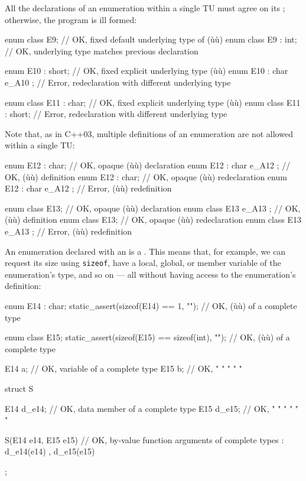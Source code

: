All the declarations of an enumeration within a single TU must agree on its ; otherwise, the program is ill formed:

\begin{emcppslisting}
enum class E9;              // OK, fixed default underlying type of (ù{}ù)
enum class E9 : int;        // OK, underlying type matches previous declaration

enum E10 : short;           // OK, fixed explicit underlying type (ù{}ù)
enum E10 : char { e_A10 };  // Error, redeclaration with different underlying type

enum class E11 : char;      // OK, fixed explicit underlying type (ù{}ù)
enum class E11 : short;     // Error, redeclaration with different underlying type
\end{emcppslisting}

Note that, as in C++03, multiple definitions of an enumeration are not allowed within a single TU:

\begin{emcppslisting}
enum E12 : char;            // OK, opaque (ù{}ù) declaration
enum E12 : char { e_A12 };  // OK, (ù{}ù) definition
enum E12 : char;            // OK, opaque (ù{}ù) redeclaration
enum E12 : char { e_A12 };  // Error, (ù{}ù) redefinition

enum class E13;             // OK, opaque (ù{}ù) declaration
enum class E13 { e_A13 };   // OK, (ù{}ù) definition
enum class E13;             // OK, opaque (ù{}ù) redeclaration
enum class E13 { e_A13 };   // Error, (ù{}ù) redefinition
\end{emcppslisting}

An enumeration  declared with an  is a .  This means that, for example, we can request its size using \lstinline!sizeof!, have a local, global, or member variable of the enumeration's type, and so on --- all without having access to the enumeration's definition:

\begin{emcppslisting}
enum E14 : char;
static_assert(sizeof(E14) == 1, "");            // OK, (ù{}ù) of a complete type

enum class E15;
static_assert(sizeof(E15) == sizeof(int), "");  // OK, (ù{}ù) of a complete type

E14 a;  // OK, variable of a complete type
E15 b;  // OK,     "     " "     "      "

struct S {
    E14 d_e14;  // OK, data member of a complete type
    E15 d_e15;  // OK,   "     "    " "     "      "

    S(E14 e14, E15 e15)  // OK, by-value function arguments of complete types
    : d_e14(e14)
    , d_e15(e15)
    {
    }
};
\end{emcppslisting}

